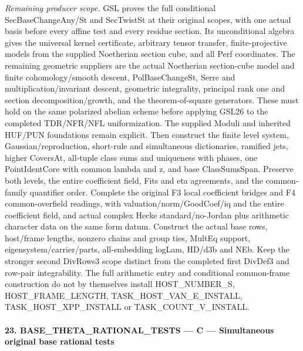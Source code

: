 \emph{Remaining producer scope.} GSL proves the full conditional SecBaseChangeAny/St and SecTwistSt at their original scopes, with one actual basis before every affine test and every residue section. Its unconditional algebra gives the universal kernel certificate, arbitrary tensor transfer, finite-projective models from the supplied Noetherian section cube, and all Perf coordinates. The remaining geometric suppliers are the actual Noetherian section-cube model and finite cohomology/smooth descent, PolBaseChangeSt, Serre and multiplication/invariant descent, geometric integrality, principal rank one and section decomposition/growth, and the theorem-of-square generators. These must hold on the same polarized abelian scheme before applying GSL26 to the completed TDR/NFR/NFL uniformization. The supplied Moduli and inherited HUF/PUN foundations remain explicit. Then construct the finite level system, Gaussian/reproduction, short-rule and simultaneous dictionaries, ramified jets, higher CoversAt, all-tuple class sums and uniqueness with phases, one PointIdentCore with common lambda and z, and base ClassSumsSpan. Preserve both levels, the entire coefficient field, Fits and eta agreements, and the common-family quantifier order. Complete the original F3 local coefficient bridges and F4 common-overfield readings, with valuation/norm/GoodCoef/iq and the entire coefficient field, and actual complex Hecke standard/no-Jordan plus arithmetic character data on the same form datum. Construct the actual base rows, host/frame lengths, nonzero chains and group ties, MultEq support, eigensystem/carrier/parts, all-embedding logLam, HD/d3b and NEb. Keep the stronger second DivRows3 scope distinct from the completed first DivDef3 and row-pair integrability. The full arithmetic entry and conditional common-frame construction do not by themselves install HOST\_\allowbreak NUMBER\_\allowbreak S, HOST\_\allowbreak FRAME\_\allowbreak LENGTH, TASK\_\allowbreak HOST\_\allowbreak VAN\_\allowbreak E\_\allowbreak INSTALL, TASK\_\allowbreak HOST\_\allowbreak XPP\_\allowbreak INSTALL or TASK\_\allowbreak COUNT\_\allowbreak V\_\allowbreak INSTALL.



\paragraph{23. BASE\_\allowbreak THETA\_\allowbreak RATIONAL\_\allowbreak TESTS — C — Simultaneous original base rational tests}

